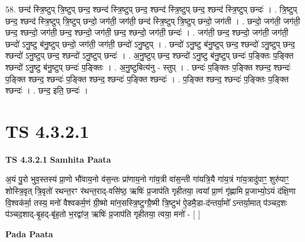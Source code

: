 \documentclass[17pt]{extarticle}
\begin{document}
58. छन्द॑ स्त्रि॒ष्टुप् त्रि॒ष्टुप् छन्द॒ श्छन्द॑ स्त्रि॒ष्टुप् छन्द॒ श्छन्द॑ स्त्रि॒ष्टुप् छन्द॒ श्छन्द॑ स्त्रि॒ष्टुप् छन्दः॑ । . त्रि॒ष्टुप् छन्द॒ श्छन्द॑ स्त्रि॒ष्टुप् त्रि॒ष्टुप् छन्दो॒ जग॑ती॒ जग॑ती॒ छन्द॑ स्त्रि॒ष्टुप् त्रि॒ष्टुप् छन्दो॒ जग॑ती । . छन्दो॒ जग॑ती॒ जग॑ती॒ छन्द॒ श्छन्दो॒ जग॑ती॒ छन्द॒ श्छन्दो॒ जग॑ती॒ छन्द॒ श्छन्दो॒ जग॑ती॒ छन्दः॑ । . जग॑ती॒ छन्द॒ श्छन्दो॒ जग॑ती॒ जग॑ती॒ छन्दो॑ ऽनु॒ष्टु ब॑नु॒ष्टुप् छन्दो॒ जग॑ती॒ जग॑ती॒ छन्दो॑ ऽनु॒ष्टुप् । . छन्दो॑ ऽनु॒ष्टु ब॑नु॒ष्टुप् छन्द॒ श्छन्दो॑ ऽनु॒ष्टुप् छन्द॒ श्छन्दो॑ ऽनु॒ष्टुप् छन्द॒ श्छन्दो॑ ऽनु॒ष्टुप् छन्दः॑ । . अ॒नु॒ष्टुप् छन्द॒ श्छन्दो॑ ऽनु॒ष्टु ब॑नु॒ष्टुप् छन्दः॑ प॒ङ्क्तिः प॒ङ्क्ति श्छन्दो॑ ऽनु॒ष्टु ब॑नु॒ष्टुप् छन्दः॑ प॒ङ्क्तिः । . अ॒नु॒ष्टुबित्य॑नु - स्तुप् । . छन्दः॑ प॒ङ्क्तिः प॒ङ्क्ति श्छन्द॒ श्छन्दः॑ प॒ङ्क्ति श्छन्द॒ श्छन्दः॑ प॒ङ्क्ति श्छन्द॒ श्छन्दः॑ प॒ङ्क्ति श्छन्दः॑ । . प॒ङ्क्ति श्छन्द॒ श्छन्दः॑ प॒ङ्क्तिः प॒ङ्क्ति श्छन्दः॑ । . छन्द॒ इति॒ छन्दः॑ । \newline
\pagebreak
{}

\section{ TS 4.3.2.1 }

\textbf{TS 4.3.2.1 } \newline
\textbf{Samhita Paata} \newline

अ॒यं पु॒रो भुव॒स्तस्य॑ प्रा॒णो भौ॑वाय॒नो व॑स॒न्तः प्रा॑णाय॒नो गा॑य॒त्री वा॑स॒न्ती गा॑यत्रि॒यै गा॑य॒त्रं गा॑य॒त्रादु॑पाꣳ॒॒ शुरु॑पाꣳ॒॒ शोस्त्रि॒वृत् त्रि॒वृतो॑ रथन्त॒रꣳ र॑थन्त॒राद्-वसि॑ष्ठ॒ ऋषिः॑ प्र॒जाप॑ति गृहीतया॒ त्वया᳚ प्रा॒णं गृ॑ह्णामि प्र॒जाभ्यो॒ऽयं द॑क्षि॒णा वि॒श्वक॑र्मा॒ तस्य॒ मनो॑ वैश्वकर्म॒णं ग्री॒ष्मो मा॑न॒सस्त्रि॒ष्टुग्ग्रै॒ष्मी त्रि॒ष्टुभ॑ ऐ॒डमै॒डा-द॑न्तर्या॒मो᳚ ऽन्तर्या॒मात् प॑ञ्चद॒शः प॑ञ्चद॒शाद्-बृ॒हद्-बृ॑ह॒तो भ॒रद्वा॑ज॒ ऋषिः॑ प्र॒जाप॑ति गृहीतया॒ त्वया॒ मनो॑ - [  ] \newline

\textbf{Pada Paata} \newline
\end{document}
